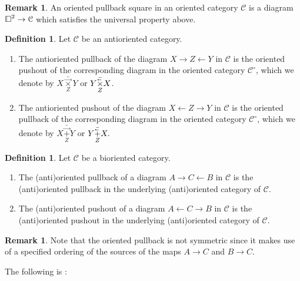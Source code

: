 \documentclass[10pt,oneside]{article}
\newcommand{\cev}[1]{\reflectbox{\ensuremath{\vec{\reflectbox{\ensuremath{#1}}}}}}
\numberwithin{equation}{section} %
\numberwithin{figure}{section} %
\theoremstyle{plain}
\theoremstyle{definition}
\newtheorem{definition}[theorem]{Definition}
\newtheorem{remark}[theorem]{Remark}
\newcommand{\mC}{{\mathcal C}}
\newcommand{\cube}{{\,\vline\negmedspace\square}}
\begin{document}
\begin{remark}
An oriented pullback square in an oriented category $\mC$ is a diagram $\cube^2\to\mC$ which satisfies the universal property above.
\end{remark}


\begin{definition}
Let $\mC$ be an antioriented category.
\begin{enumerate}[\normalfont(1)]\setlength{\itemsep}{-2pt}
\item 
The antioriented pullback of the diagram $X \to Z\leftarrow Y$ in $\mC$ is the oriented pushout of the corresponding diagram in the oriented category $\mC^\circ$, which we denote by $X\underset{Z}{\bar{\vec{\times}}} Y$ or $ Y\underset{Z}{{\bar{\cev\times}}} X$.

\item 
The antioriented pushout of the diagram $X \leftarrow Z\to Y$ in $\mC$
is the oriented pullback of the corresponding diagram in the oriented category $\mC^\circ$, which we denote by $ X\underset{Z}{{\bar{\vec{+}}}} Y $ or $Y\underset{Z}{\bar{\cev{+}}} X.$

\end{enumerate}

\end{definition}

\begin{definition}Let $\mC$ be a bioriented category.
\begin{enumerate}[\normalfont(1)]\setlength{\itemsep}{-2pt}

\item The (anti)oriented pullback of a diagram $A \to C\leftarrow B$ in $\mC$ is the (anti)oriented pullback in the underlying (anti)oriented category of $\mC$.

\item The (anti)oriented pushout of a diagram $A \leftarrow C \to B$ in $\mC$ is the (anti)oriented pushout in the underlying (anti)oriented category of $\mC$.

\end{enumerate}

\end{definition}

\begin{remark}
Note that the oriented pullback is not symmetric since it makes use of a specified ordering of the sources of the maps $A\to C$ and $B\to C$.
\end{remark}

The following is \cite[Lemma 3.8.6.]{oriented}:
\end{document}
